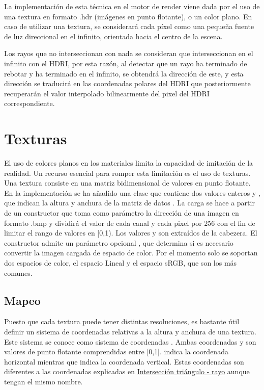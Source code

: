 \begin{itemize}
	La implementación de esta técnica en el motor de render viene dada por el uso de una textura en formato .hdr (imágenes en punto flotante), o un color plano. En caso de utilizar una textura, se considerará cada píxel como una pequeña fuente de luz direccional en el infinito, orientada hacia el centro de la escena. 

	Los rayos que no interseccionan con nada se consideran que interseccionan en el infinito con el HDRI, por esta razón, al detectar que un rayo ha terminado de rebotar y ha terminado en el infinito, se obtendrá la dirección de este, y esta dirección se traducirá en las coordenadas polares del HDRI que posteriormente recuperarán el valor interpolado bilinearmente del pixel del HDRI correspondiente.

\end{itemize}

	\section{Texturas}
	
	El uso de colores planos en los materiales limita la capacidad de imitación de la realidad. Un recurso esencial para romper esta limitación es el uso de texturas. Una textura consiste en una matriz bidimensional de valores en punto flotante. En la implementación se ha añadido una clase  que contiene dos valores enteros  y , que indican la altura y anchura de la matriz de datos . La carga se hace a partir de un constructor que toma como parámetro la dirección de una imagen en formato .bmp y dividirá el valor de cada canal y cada pixel por 256 con el fin de limitar el rango de valores en [0,1). Los valores  y  son extraídos de la cabezera. El constructor admite un parámetro opcional , que determina si es necesario convertir la imagen cargada de espacio de color. Por el momento solo se soportan dos espacios de color, el espacio Lineal y el espacio sRGB, que son los más comunes.
	
	
	\subsection{Mapeo}

	Puesto que cada textura puede tener distintas resoluciones, es bastante útil definir un sistema de coordenadas relativas a la altura y anchura de una textura. Este sistema se conoce como sistema de coordenadas . Ambas coordenadas  y  son valores de punto flotante comprendidas entre [0,1].  indica la coordenada horizontal mientras que  indica la coordenada vertical. Estas coordenadas son diferentes a las coordenadas  explicadas en \hyperref[subsec:triintersection]{Intersección triángulo - rayo} aunque tengan el mismo nombre.


